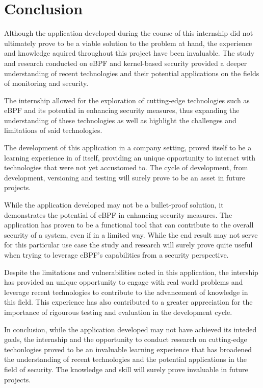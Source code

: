 \chapter{Conclusion}

Although the application developed during the course of this internship did not ultimately prove to be a viable solution to the problem at hand, the experience and knowledge aquired throughout this project have been invaluable. The study and research conducted on eBPF and kernel-based security provided a deeper understanding of recent technologies and their potential applications on the fields of monitoring and security.

The internship allowed for the exploration of cutting-edge technologies such as eBPF and its potential in enhancing security measures, thus expanding the understanding of these technologies as well as highlight the challenges and limitations of said technologies.

The development of this application in a company setting, proved itself to be a learning experience in of itself, providing an unique opportunity to interact with technologies that were not yet accustomed to. The cycle of development, from development, versioning and testing will surely prove to be an asset in future projects.

While the application developed may not be a bullet-proof solution, it demonstrates the potential of eBPF in enhancing security measures. 
The application has proven to be a functional tool that can contribute to the overall security of a system, even if in a limited way.
While the end result may not serve for this particular use case the study and research will surely prove quite useful when trying to leverage eBPF's capabilities from a security perspective. 

Despite the limitations and vulnerabilities noted in this application, the intership has provided an unique opportunity to engage with real world problems and leverage recent technologies to contribute to the advancement of knowledge in this field. This experience has also contributed to a greater appreciation for the importance of rigourous testing and evaluation in the development cycle.

In conclusion, while the application developed may not have achieved its inteded goals, the internship and the opportunity to conduct research on cutting-edge techonlogies proved to be an invaluable learning experience that has broadened the understanding of recent technologies and the potential applications in the field of security. The knowledge and skill will surely prove invaluable in future projects.


